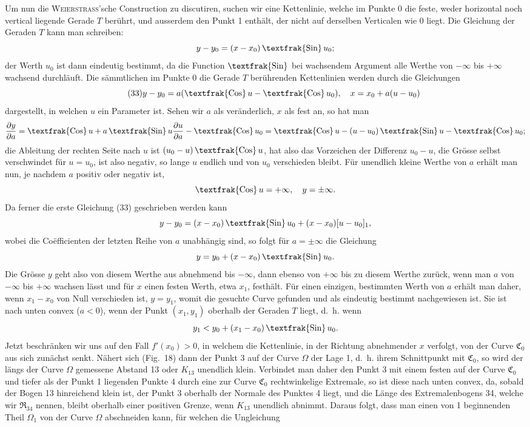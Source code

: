 \documentclass[11pt,a4paper,leqno]{article}
\newcommand{\Cof}{\mathop{\text{\textfrak{Cos}}}\nolimits}
\newcommand{\Sin}{\mathop{\text{\textfrak{Sin}}}\nolimits}
\begin{document}
Um nun die \textsc{Weierstrass}'sche Construction zu discutiren, suchen wir eine Kettenlinie, welche im Punkte 0 die feste, weder horizontal noch vertical liegende Gerade $T$ berührt, und ausserdem den Punkt 1 enthält, der nicht auf derselben Verticalen wie 0 liegt. Die Gleichung der Geraden $T$ kann man schreiben:
\[
y-y_0=(x-x_0)\Sin u_0;
\]
der Werth $u_0$ ist dann eindeutig bestimmt, da die Function $\Sin$ bei wachsendem Argument alle Werthe von $-\infty$ bis $+\infty$ wachsend durchläuft. Die sämmtlichen im Punkte 0 die Gerade $T$ berührenden Kettenlinien werden durch die Gleichungen
\begin{equation}\tag{33}
y-y_0=a(\Cof u-\Cof u_0),\quad x=x_0+a(u-u_0)
\end{equation}
dargestellt, in welchen $u$ ein Parameter ist. Sehen wir $a$ als veränderlich, $x$ als fest an, so hat man
\[
\frac{\partial y}{\partial a}=\Cof u+a\Sin u\frac{\partial u}{\partial a}-\Cof u_0
=\Cof u-(u-u_0)\Sin u-\Cof u_0;
\]
die Ableitung der rechten Seite nach $u$ ist $(u_0-u)\Cof u$, hat also das Vorzeichen der Differenz $u_0-u$, die Grösse selbst verschwindet für $u=u_0$, ist also negativ, so lange $u$ endlich und von $u_0$ verschieden bleibt. Für unendlich kleine Werthe von $a$ erhält man nun, je nachdem $a$ positiv oder negativ ist,
\[
\Cof u=+\infty,\quad y=\pm\infty.
\]
Da ferner die erste Gleichung (33) geschrieben werden kann
\[
y-y_0=(x-x_0)\Sin u_0+(x-x_0)[u-u_0]_1,
\]
wobei die Coëfficienten der letzten Reihe von $a$ unabhängig sind, so folgt für $a=\pm\infty$ die Gleichung
\[
y=y_0+(x-x_0)\Sin u_0.
\]
Die Grösse $y$ geht also von diesem Werthe aus abnehmend bis $-\infty$, dann ebenso von $+\infty$ bis zu diesem Werthe zurück, wenn man $a$ von $-\infty$ bis $+\infty$ wachsen lässt und für $x$ einen festen Werth, etwa $x_1$, festhält. Für einen einzigen, bestimmten Werth von $a$ erhält man daher, wenn $x_1-x_0$ von Null verschieden ist, $y=y_1$, womit die gesuchte Curve gefunden und als eindeutig bestimmt nachgewiesen ist. Sie ist nach unten convex ($a<0$), wenn der Punkt $(x_1,y_1)$ oberhalb der Geraden $T$ liegt, d.~h. wenn
\[
y_1<y_0+(x_1-x_0)\Sin u_0.
\]
Jetzt beschränken wir uns auf den Fall $f'(x_0)>0$, in welchem die Kettenlinie, in der Richtung abnehmender $x$ verfolgt, von der Curve $\mathfrak{C}_0$ aus sich zunächst senkt. Nähert sich (Fig.~18) dann der Punkt 3 auf der Curve $\Omega$ der Lage 1, d.~h. ihrem Schnittpunkt mit $\mathfrak{C}_0$, so wird der längs der Curve $\Omega$ gemessene Abstand 13 oder $K_{13}$ unendlich klein. Verbindet man daher den Punkt 3 mit einem festen auf der Curve $\mathfrak{C}_0$ und tiefer als der Punkt 1 liegenden Punkte 4 durch eine zur Curve $\mathfrak{C}_0$ rechtwinkelige Extremale, so ist diese nach unten convex, da, sobald der Bogen 13 hinreichend klein ist, der Punkt 3 oberhalb der Normale des Punktes 4 liegt, und die Länge des Extremalenbogens 34, welche wir $\mathfrak{R}_{34}$ nennen, bleibt oberhalb einer positiven Grenze, wenn $K_{13}$ unendlich abnimmt. Daraus folgt, dass man einen von 1 beginnenden Theil $\Omega_1$ von der Curve $\Omega$ abschneiden kann, für welchen die Ungleichung
\end{document}

